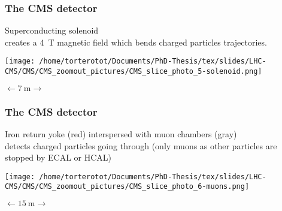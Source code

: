 \begin{frame}\addtocounter{framenumber}{-1}
\frametitle{The CMS detector}
\begin{center}
Superconducting solenoid\\
creates a \SI{4}{\tesla} magnetic field which bends charged particles trajectories.

\texttt{[image: /home/torterotot/Documents/PhD-Thesis/tex/slides/LHC-CMS/CMS/CMS\_zoomout\_pictures/CMS\_slice\_photo\_5-solenoid.png]}

$\longleftarrow \SI{7}{\meter} \longrightarrow$
\end{center}
\end{frame}
\begin{frame}\addtocounter{framenumber}{-1}
\frametitle{The CMS detector}
\begin{center}
Iron return yoke (red) interspersed with muon chambers (gray)\\
detects charged particles going through (only muons as other particles are stopped by ECAL or HCAL)

\texttt{[image: /home/torterotot/Documents/PhD-Thesis/tex/slides/LHC-CMS/CMS/CMS\_zoomout\_pictures/CMS\_slice\_photo\_6-muons.png]}

$\longleftarrow \SI{15}{\meter} \longrightarrow$
\end{center}
\end{frame}